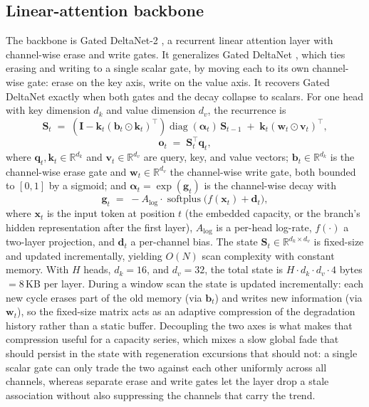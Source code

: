 \documentclass[final,5p,times,twocolumn]{elsarticle}
\begin{document}
\subsection{Linear-attention backbone}
\label{sec:gdn2}

The backbone is Gated DeltaNet-2 \cite{ref_gdn2}, a
recurrent linear attention layer with channel-wise erase and write
gates. It generalizes Gated DeltaNet \cite{ref_gdn}, which ties
erasing and writing to a single scalar gate, by moving each to its own
channel-wise gate: erase on the key axis, write on the value axis. It
recovers Gated DeltaNet exactly when both gates and the decay
collapse to scalars. For one head with key dimension $d_k$ and value dimension
$d_v$, the recurrence is
\begin{equation}
\label{eq:gdn2}
\mathbf{S}_t \;=\; \left( \mathbf{I} - \mathbf{k}_t(\mathbf{b}_t
\odot \mathbf{k}_t)^{\top} \right)
\operatorname{diag}(\boldsymbol{\alpha}_t)\, \mathbf{S}_{t-1}
\;+\; \mathbf{k}_t(\mathbf{w}_t \odot \mathbf{v}_t)^{\top},
\end{equation}
\begin{equation}
\label{eq:readout}
\mathbf{o}_t \;=\; \mathbf{S}_t^{\top}\mathbf{q}_t,
\end{equation}
where $\mathbf{q}_t,\mathbf{k}_t \in \mathbb{R}^{d_k}$ and
$\mathbf{v}_t \in \mathbb{R}^{d_v}$ are query, key, and value vectors;
$\mathbf{b}_t \in \mathbb{R}^{d_k}$ is the channel-wise erase gate and
$\mathbf{w}_t \in \mathbb{R}^{d_v}$ the channel-wise write gate, both
bounded to $[0,1]$ by a sigmoid; and
$\boldsymbol{\alpha}_t = \exp(\mathbf{g}_t)$ is the channel-wise decay
with
\begin{equation}
\mathbf{g}_t \;=\; -A_{\log}\cdot
\operatorname{softplus}\!\big( f(\mathbf{x}_t) + \mathbf{d}_t \big),
\end{equation}
where $\mathbf{x}_t$ is the input token at position $t$ (the embedded
capacity, or the branch's hidden representation after the first
layer), $A_{\log}$ is a per-head log-rate, $f(\cdot)$ a two-layer
projection, and $\mathbf{d}_t$ a per-channel bias. The state
$\mathbf{S}_t \in \mathbb{R}^{d_k \times d_v}$ is fixed-size and
updated incrementally, yielding $O(N)$ scan complexity with
constant memory. With $H$ heads, $d_k=16$, and $d_v=32$, the total
state is $H \cdot d_k \cdot d_v \cdot 4$ bytes $= 8$\,KB per layer.
During a window scan the state is updated incrementally: each new
cycle erases part of the old memory (via $\mathbf{b}_t$) and writes
new information (via $\mathbf{w}_t$), so the fixed-size matrix acts
as an adaptive compression of the degradation history rather than a
static buffer. Decoupling the two axes is what makes that compression
useful for a capacity series, which mixes a slow global fade that
should persist in the state with regeneration excursions that should
not: a single scalar gate can only trade the two against each other
uniformly across all channels, whereas separate erase and write gates
let the layer drop a stale association without also suppressing the
channels that carry the trend.
\end{document}

